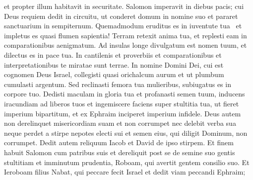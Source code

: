 \begin{biblechapter}
\begin{biblechapter}
\begin{biblechapter}
\begin{biblechapter}
\begin{biblechapter}
\begin{biblechapter}
\begin{biblechapter}
\begin{biblechapter}
\begin{biblechapter}
\begin{biblechapter}
\begin{biblechapter}
\begin{biblechapter}
\begin{biblechapter}
\begin{biblechapter}
\begin{biblechapter}
\begin{biblechapter}
\begin{biblechapter}
\begin{biblechapter}
\begin{biblechapter}
\begin{biblechapter}
\begin{biblechapter}
\begin{biblechapter}
\begin{biblechapter}
\begin{biblechapter}
\begin{biblechapter}
\begin{biblechapter}
\begin{biblechapter}
\begin{biblechapter}
\begin{biblechapter}
\begin{biblechapter}
\begin{biblechapter}
\begin{biblechapter}
\begin{biblechapter}
\begin{biblechapter}
\begin{biblechapter}
\begin{biblechapter}
\begin{biblechapter}
\begin{biblechapter}
\begin{biblechapter}
\begin{biblechapter}
\begin{biblechapter}
\begin{biblechapter}
\begin{biblechapter}
\begin{biblechapter}
\begin{biblechapter}
\begin{biblechapter}
\begin{biblechapter}
 et propter illum habitavit in securitate.
 \verse Salomon imperavit in diebus pacis;
 cui Deus requiem dedit in circuitu,
 ut conderet domum in nomine suo et pararet sanctuarium in sempiternum. Quemadmodum eruditus es in iuventute tua 
 \verse et impletus es quasi flumen sapientia!
 Terram retexit anima tua,
 \verse et replesti eam in comparationibus aenigmatum.
 Ad insulas longe divulgatum est nomen tuum,
 et dilectus es in pace tua.
 \verse In cantilenis et proverbiis
 et comparationibus et interpretationibus
 te miratae sunt terrae.
 \verse In nomine Domini Dei,
 cui est cognomen Deus Israel,
 \verse collegisti quasi orichalcum aurum
 et ut plumbum cumulasti argentum.
 \verse Sed reclinasti femora tua mulieribus,
 subiugatus es in corpore tuo.
 \verse Dedisti maculam in gloria tua
 et profanasti semen tuum,
 inducens iracundiam ad liberos tuos
 et ingemiscere faciens super stultitia tua,
 \verse ut fieret imperium bipartitum,
 et ex Ephraim inciperet imperium infidele.
 \verse Deus autem non derelinquet misericordiam suam
 et non corrumpet nec delebit verba sua
 neque perdet a stirpe nepotes electi sui
 et semen eius, qui diligit Dominum, non corrumpet.
 \verse Dedit autem reliquum Iacob
 et David de ipso stirpem.
 \verse Et finem habuit Salomon cum patribus suis
 \verse et dereliquit post se de semine suo
 gentis stultitiam 
\verse et imminutum prudentia,
 Roboam, qui avertit gentem consilio suo.
 \verse Et Ieroboam filius Nabat, qui peccare fecit Israel
 et dedit viam peccandi Ephraim;

\end{biblechapter}
\end{biblechapter}
\end{biblechapter}
\end{biblechapter}
\end{biblechapter}
\end{biblechapter}
\end{biblechapter}
\end{biblechapter}
\end{biblechapter}
\end{biblechapter}
\end{biblechapter}
\end{biblechapter}
\end{biblechapter}
\end{biblechapter}
\end{biblechapter}
\end{biblechapter}
\end{biblechapter}
\end{biblechapter}
\end{biblechapter}
\end{biblechapter}
\end{biblechapter}
\end{biblechapter}
\end{biblechapter}
\end{biblechapter}
\end{biblechapter}
\end{biblechapter}
\end{biblechapter}
\end{biblechapter}
\end{biblechapter}
\end{biblechapter}
\end{biblechapter}
\end{biblechapter}
\end{biblechapter}
\end{biblechapter}
\end{biblechapter}
\end{biblechapter}
\end{biblechapter}
\end{biblechapter}
\end{biblechapter}
\end{biblechapter}
\end{biblechapter}
\end{biblechapter}
\end{biblechapter}
\end{biblechapter}
\end{biblechapter}
\end{biblechapter}
\end{biblechapter}
